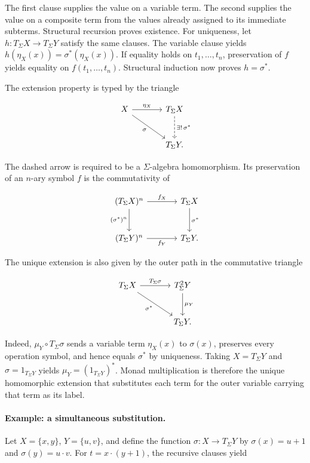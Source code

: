 \documentclass[11pt]{article}
\begin{document}
The first clause supplies the value on a variable term. The second supplies the
value on a composite term from the values already assigned to its immediate
subterms. Structural recursion proves existence. For uniqueness, let
\(h:T_\Sigma X\to T_\Sigma Y\) satisfy the same clauses. The variable clause
yields \(h(\eta_X(x))=\sigma^*(\eta_X(x))\). If equality holds on
\(t_1,\ldots,t_n\), preservation of \(f\) yields equality on
\(f(t_1,\ldots,t_n)\). Structural induction now proves \(h=\sigma^*\).

The extension property is typed by the triangle

\[
\begin{tikzcd}[row sep=large,column sep=large]
X \arrow[r,"\eta_X"] \arrow[dr,"\sigma"'] &
T_\Sigma X \arrow[d,dashed,"{\exists!\,\sigma^*}"] \\
& T_\Sigma Y.
\end{tikzcd}
\]

The dashed arrow is required to be a \(\Sigma\)-algebra homomorphism. Its
preservation of an \(n\)-ary symbol \(f\) is the commutativity of

\[
\begin{tikzcd}[row sep=large,column sep=large]
(T_\Sigma X)^n \arrow[r,"f_X"] \arrow[d,"(\sigma^*)^n"'] &
T_\Sigma X \arrow[d,"\sigma^*"] \\
(T_\Sigma Y)^n \arrow[r,"f_Y"'] & T_\Sigma Y.
\end{tikzcd}
\]

The unique extension is also given by the outer path in the commutative
triangle

\[
\begin{tikzcd}[row sep=large,column sep=large]
T_\Sigma X \arrow[r,"T_\Sigma\sigma"] \arrow[dr,"\sigma^*"'] &
T_\Sigma^2Y \arrow[d,"\mu_Y"] \\
& T_\Sigma Y.
\end{tikzcd}
\]

Indeed, \(\mu_Y\circ T_\Sigma\sigma\) sends a variable term
\(\eta_X(x)\) to \(\sigma(x)\), preserves every operation symbol, and hence
equals \(\sigma^*\) by uniqueness. Taking
\(X=T_\Sigma Y\) and \(\sigma=1_{T_\Sigma Y}\) yields
\(\mu_Y=(1_{T_\Sigma Y})^*\). Monad multiplication is therefore the unique
homomorphic extension that substitutes each term for the outer variable
carrying that term as its label.

\paragraph{Example: a simultaneous substitution.}
Let \(X=\{x,y\}\), \(Y=\{u,v\}\), and define the function
\(\sigma:X\to T_\Sigma Y\) by
\(\sigma(x)=u+1\) and \(\sigma(y)=u\cdot v\). For
\(t=x\cdot(y+1)\), the recursive clauses yield
\end{document}
